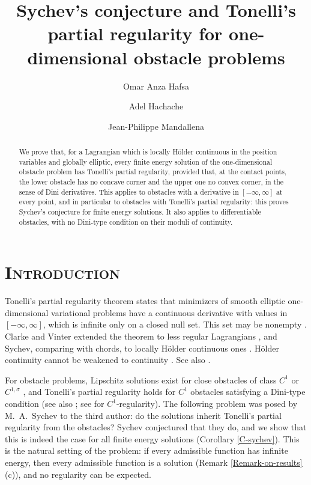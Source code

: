 \documentclass[reqno,12pt]{amsart}
\title[{\tiny Sychev's conjecture and Tonelli's partial regularity}]{Sychev's conjecture and Tonelli's partial regularity for one-dimensional obstacle problems}
\author{\sc Omar Anza Hafsa}
\author{\sc Adel Hachache}
\author{Jean-Philippe Mandallena}
\numberwithin{equation}{section}
\theoremstyle{remark}
\begin{document}
\maketitle
\begin{abstract}
We prove that, for a Lagrangian which is locally H\"older continuous in the position variables and globally elliptic, every finite energy solution of the one-dimensional obstacle problem has Tonelli's partial regularity, provided that, at the contact points, the lower obstacle has no concave corner and the upper one no convex corner, in the sense of Dini derivatives. This applies to obstacles with a derivative in $[-\infty,\infty]$ at every point, and in particular to obstacles with Tonelli's partial regularity: this proves Sychev's conjecture for finite energy solutions. It also applies to differentiable obstacles, with no Dini-type condition on their moduli of continuity.
\end{abstract}



\tableofcontents


\newpage



\section{\textsc{\textsf{Introduction}}}

Tonelli's partial regularity theorem \cite{tonelli} states that minimizers of smooth elliptic one-dimensional variational problems have a continuous derivative with values in $[-\infty,\infty]$, which is infinite only on a closed null set. This set may be nonempty \cite{ball-mizel85}. Clarke and Vinter extended the theorem to less regular Lagrangians \cite{clarke-vinter85}, and Sychev, comparing with chords, to locally H\"older continuous ones \cite{sychev89,sychev91,sychev92}. H\"older continuity cannot be weakened to continuity \cite{gratwick-preiss11}. See also \cite{Reshetnyak-book82,GST16,buttazzo-Giaquinta-hildebrandt98}.

\medskip

For obstacle problems, Lipschitz solutions exist for close obstacles of class $C^1$ or $C^{1,\sigma}$ \cite{sychev11}, and Tonelli's partial regularity holds for $C^1$ obstacles satisfying a Dini-type condition \cite{mandallena18} (see also \cite{gratwick-sychev19}; see \cite{mandallena19} for $C^1$-regularity). The following problem was posed by M.~A.~Sychev to the third author: do the solutions inherit Tonelli's partial regularity from the obstacles? Sychev conjectured that they do, and we show that this is indeed the case for all finite energy solutions (Corollary \ref{C-sychev}). This is the natural setting of the problem: if every admissible function has infinite energy, then every admissible function is a solution (Remark \ref{Remark-on-results}(c)), and no regularity can be expected.
\end{document}

